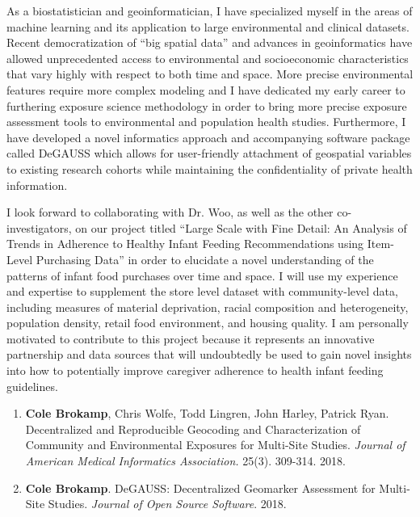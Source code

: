 \documentclass{nihbiosketch}
\begin{document}
\begin{statement}

As a biostatistician and geoinformatician, I have specialized myself in the
areas of machine learning and its application to large environmental and
clinical datasets. Recent democratization of “big spatial data” and advances in
geoinformatics have allowed unprecedented access to environmental and
socioeconomic characteristics that vary highly with respect to both time and
space. More precise environmental features require more complex modeling and I
have dedicated my early career to furthering exposure science methodology in
order to bring more precise exposure assessment tools to environmental and
population health
studies. Furthermore, I have developed a novel informatics approach and
accompanying software package called DeGAUSS which allows for user-friendly
attachment of geospatial variables to existing research cohorts while
maintaining the confidentiality of private health information.

I look forward to collaborating with Dr. Woo, as well
as the other co-investigators, on our project titled ``Large Scale with Fine
Detail: An Analysis of Trends in Adherence to Healthy Infant Feeding
Recommendations using Item-Level Purchasing Data'' in order to elucidate a novel understanding of the
patterns of infant food purchases over time and space. I will use my experience
and expertise to supplement the store level dataset with community-level data,
including measures of material deprivation, racial composition and
heterogeneity, population density, retail food environment, and housing quality.
I am personally motivated to contribute to this project because it represents
an innovative partnership and data sources that will undoubtedly be used to gain
novel insights into how to potentially improve caregiver adherence to health
infant feeding guidelines. \\

\begin{enumerate}

	\item \textbf{Cole Brokamp}, Chris Wolfe, Todd Lingren, John Harley, Patrick Ryan. Decentralized and Reproducible Geocoding and Characterization of Community and Environmental Exposures for Multi-Site Studies. \textit{Journal of American Medical Informatics Association.} 25(3). 309-314. 2018.
	
	\item \textbf{Cole Brokamp}. DeGAUSS: Decentralized Geomarker Assessment for Multi-Site Studies. \textit{Journal of Open Source Software}. 2018. 

\end{enumerate}

\end{statement}
\end{document}
